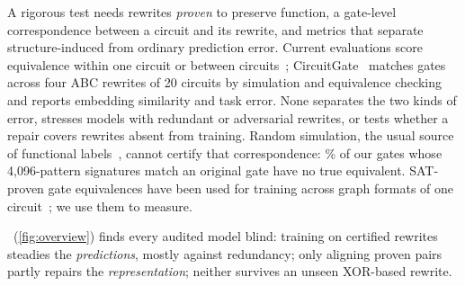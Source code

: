A rigorous test needs rewrites \emph{proven} to preserve function, a gate-level correspondence between a circuit
and its rewrite, and metrics that separate structure-induced from ordinary prediction error. Current evaluations
score equivalence within one circuit or between circuits~\cite{DBLP:conf/iccad/ShiPKLLHZYCX23,DBLP:conf/dac/ZhengZZX26,DBLP:conf/iclr/WuZ0025,DBLP:conf/nips/ZhengLSX25}; CircuitGate~\cite{DBLP:journals/corr/abs-2610-09549}
matches gates across four ABC rewrites of 20 circuits by simulation and equivalence checking and reports
embedding similarity and task error. None separates the two kinds of error, stresses models with redundant or adversarial rewrites, or tests whether a repair covers
rewrites absent from training. Random simulation, the usual source of
functional labels~\cite{DBLP:conf/dac/0019KSWY022,DBLP:conf/iccad/ShiPKLLHZYCX23}, cannot certify that correspondence: \SigFalsePct\% of our
gates whose 4{,}096-pattern signatures match an original gate have no true equivalent. SAT-proven gate equivalences
have been used for training across graph formats of one circuit~\cite{DBLP:journals/corr/abs-2509-20968}; we use them to measure.

\audit\ (\cref{fig:overview}) finds every audited model blind: training on certified rewrites steadies the
\emph{predictions}, mostly against redundancy; only aligning proven pairs partly repairs the \emph{representation}; neither survives
an unseen XOR-based rewrite.

